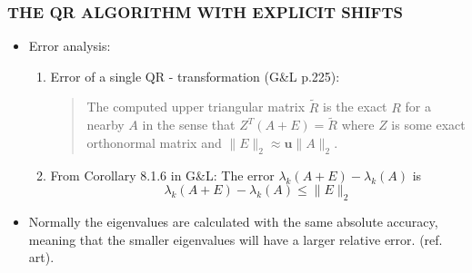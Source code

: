 \documentclass[a4paper,8pt]{beamer} %
\newcommand{\ts}[1]{\textbf{#1}}
\newcommand{\norm}[1]{\lVert{#1}\rVert}
\begin{document}
\begin{frame}  %
\frametitle{THE QR ALGORITHM WITH EXPLICIT SHIFTS}
\begin{itemize}
	\item Error analysis:
		\begin{enumerate}
			\item Error of a single QR - transformation
				(G\&L p.225):\\
				\begin{quote}
					The computed upper triangular matrix $\tilde R$ is the exact $R$ for a nearby $A$
					in the sense that $Z^T(A+E)=\tilde R$ where $Z$ is some exact orthonormal matrix
					and $\norm{E}_2\approx\ts u\norm{A}_2$.
				\end{quote}
			\item From Corollary 8.1.6 in G\&L: The error $\lambda_k(A+E)-\lambda_k(A)$ is
				\begin{equation}
					\lambda_k(A+E)-\lambda_k(A) \le \norm{E}_2 
				\end{equation}
		\end{enumerate}
	\item Normally the eigenvalues are calculated with the same absolute accuracy, meaning that the 
			smaller eigenvalues will have a larger relative error. (ref. art).
\end{itemize}
\end{frame} %
\end{document}
